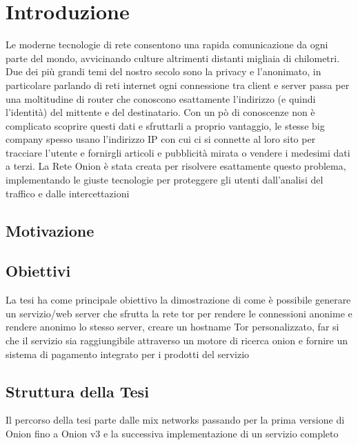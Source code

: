 \chapter{Introduzione}
\label{chap:intro}

Le moderne tecnologie di rete consentono una rapida comunicazione da ogni parte del mondo, avvicinando culture altrimenti distanti migliaia di chilometri. Due dei più grandi temi del nostro secolo sono la privacy e l'anonimato, in particolare parlando di reti internet ogni connessione tra client e server passa per una moltitudine di router che conoscono esattamente l'indirizzo (e quindi l'identità) del mittente e del destinatario. Con un pò di conoscenze non è complicato scoprire questi dati e sfruttarli a proprio vantaggio, le stesse big company spesso usano l'indirizzo IP con cui ci si connette al loro sito per tracciare l'utente e fornirgli articoli e pubblicità mirata o vendere i medesimi dati a terzi. 
La Rete Onion è stata creata per risolvere esattamente questo problema, implementando le giuste tecnologie per proteggere gli utenti dall'analisi del traffico e dalle intercettazioni

\section{Motivazione}
\section{Obiettivi}

La tesi ha come principale obiettivo la dimostrazione di come è possibile generare un servizio/web server che sfrutta la rete tor per rendere le connessioni anonime e rendere anonimo lo stesso server, creare un hostname Tor personalizzato, far si che il servizio sia raggiungibile attraverso un motore di ricerca onion e fornire un sistema di pagamento integrato per i prodotti del servizio

\section{Struttura della Tesi}
Il percorso della tesi parte dalle mix networks passando per la prima versione di Onion fino a Onion v3 e la successiva implementazione di un servizio completo